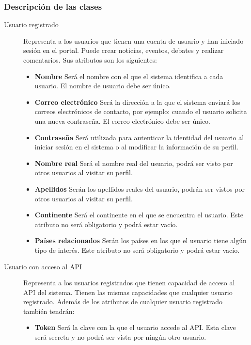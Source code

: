 \subsubsection{Descripción de las clases}
\begin{description}
\item[Usuario registrado]	Representa a los usuarios que tienen una cuenta de usuario y han iniciado sesión en el portal.  Puede crear noticias, eventos, debates y realizar comentarios.  Sus atributos son los siguientes:
							\begin{itemize}
								\item \textbf{Nombre}  Será el nombre con el que el sistema identifica a cada usuario.  El nombre de usuario debe ser único.
								\item \textbf{Correo electrónico}  Será la dirección a la que el sistema enviará los correos electrónicos de contacto, por ejemplo: cuando el usuario solicita una nueva contraseña.  El correo electrónico debe ser único.
								\item \textbf{Contraseña}  Será utilizada para autenticar la identidad del usuario al iniciar sesión en el sistema o al modificar la información de su perfil.
								\item \textbf{Nombre real}  Será el nombre real del usuario, podrá ser visto por otros usuarios al visitar su perfil.
								\item \textbf{Apellidos}  Serán los apellidos reales del usuario, podrán ser vistos por otros usuarios al visitar su perfil.
								\item \textbf{Continente}  Será el continente en el que se encuentra el usuario.  Este atributo no será obligatorio y podrá estar vacío.
								\item \textbf{Países relacionados}  Serán los países en los que el usuario tiene algún tipo de interés.  Este atributo no será obligatorio y podrá estar vacío.
							\end{itemize}
\item[Usuario con acceso al API]  Representa a los usuarios registrados que tienen capacidad de acceso al API del sistema.  Tienen las mismas capacidades que cualquier usuario registrado.  Además de los atributos de cualquier usuario registrado también tendrán:
							\begin{itemize}
							\item \textbf{Token}  Será la clave con la que el usuario accede al API.  Esta clave será secreta y no podrá ser vista por ningún otro usuario.
							\end{itemize}

\end{description}
